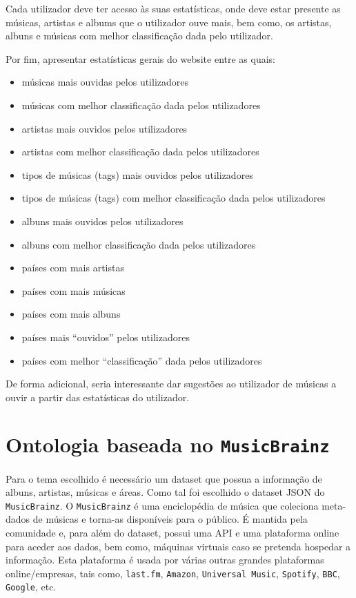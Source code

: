 \documentclass{article}
\begin{document}
Cada utilizador deve ter acesso às suas estatísticas, onde deve estar presente as músicas, artistas e albums que o utilizador ouve mais, bem como, os artistas, albuns e músicas com melhor classificação dada pelo utilizador.

Por fim, apresentar estatísticas gerais do website entre as quais:
\begin{itemize}
    \item músicas mais ouvidas pelos utilizadores
    \item músicas com melhor classificação dada pelos utilizadores
    \item artistas mais ouvidos pelos utilizadores
    \item artistas com melhor classificação dada pelos utilizadores
    \item tipos de músicas (tags) mais ouvidos pelos utilizadores
    \item tipos de músicas (tags) com melhor classificação dada pelos utilizadores
    \item albuns mais ouvidos pelos utilizadores
    \item albuns com melhor classificação dada pelos utilizadores
    \item países com mais artistas
    \item países com mais músicas
    \item países com mais albuns
    \item países mais ``ouvidos'' pelos utilizadores
    \item países com melhor ``classificação'' dada pelos utilizadores
\end{itemize}

De forma adicional, seria interessante dar sugestões ao utilizador de músicas a ouvir a partir das estatísticas do utilizador.

\section{Ontologia baseada no \texttt{MusicBrainz}} \label{ontologia}

Para o tema escolhido é necessário um dataset que possua a informação de albuns, artistas, músicas e áreas. Como tal foi escolhido o dataset JSON do \texttt{MusicBrainz}. O \texttt{MusicBrainz} é uma enciclopédia de música que coleciona meta-dados de músicas e torna-as disponíveis para o público. É mantida pela comunidade e, para além do dataset, possui uma API e uma plataforma online para aceder aos dados, bem como, máquinas virtuais caso se pretenda hospedar a informação. Esta plataforma é usada por várias outras grandes plataformas online/empresas, tais como, \texttt{last.fm}, \texttt{Amazon}, \texttt{Universal Music}, \texttt{Spotify}, \texttt{BBC}, \texttt{Google}, etc.
\end{document}
